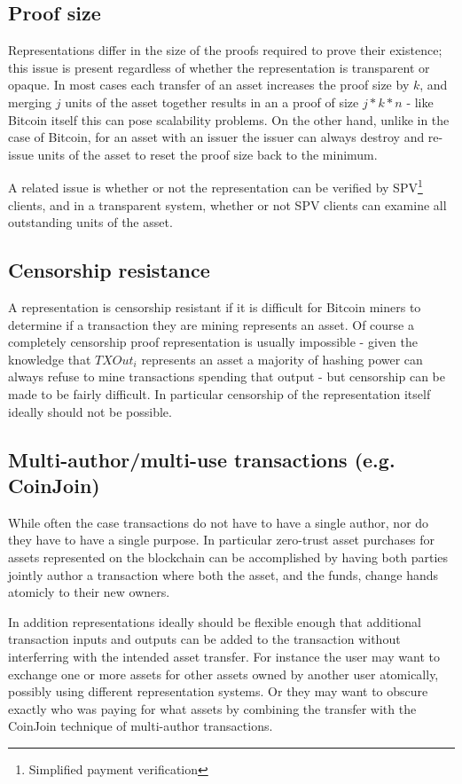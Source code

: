 \documentclass{article}
\begin{document}
\subsection{Proof size}

Representations differ in the size of the proofs required to prove their
existence; this issue is present regardless of whether the representation is
transparent or opaque. In most cases each transfer of an asset increases the
proof size by $k$, and merging $j$ units of the asset together results in an a
proof of size $j*k*n$ - like Bitcoin itself this can pose scalability problems.
On the other hand, unlike in the case of Bitcoin, for an asset with an issuer
the issuer can always destroy and re-issue units of the asset to reset the
proof size back to the minimum.

A related issue is whether or not the representation can be verified by
SPV\footnote{Simplified payment verification} clients, and in a transparent
system, whether or not SPV clients can examine all outstanding units of the
asset.


\subsection{Censorship resistance}

A representation is censorship resistant if it is difficult for Bitcoin miners
to determine if a transaction they are mining represents an asset. Of course a
completely censorship proof representation is usually impossible - given the
knowledge that $TXOut_i$ represents an asset a majority of hashing power can
always refuse to mine transactions spending that output - but censorship can be
made to be fairly difficult. In particular censorship of the representation
itself ideally should not be possible.


\subsection{Multi-author/multi-use transactions (e.g. CoinJoin)}

While often the case transactions do not have to have a single author, nor do
they have to have a single purpose. In particular zero-trust asset purchases
for assets represented on the blockchain can be accomplished by having both
parties jointly author a transaction where both the asset, and the funds,
change hands atomicly to their new owners.

In addition representations ideally should be flexible enough that additional
transaction inputs and outputs can be added to the transaction without
interferring with the intended asset transfer. For instance the user may want
to exchange one or more assets for other assets owned by another user
atomically, possibly using different representation systems. Or they may want
to obscure exactly who was paying for what assets by combining the transfer
with the CoinJoin technique of multi-author transactions.
\end{document}

